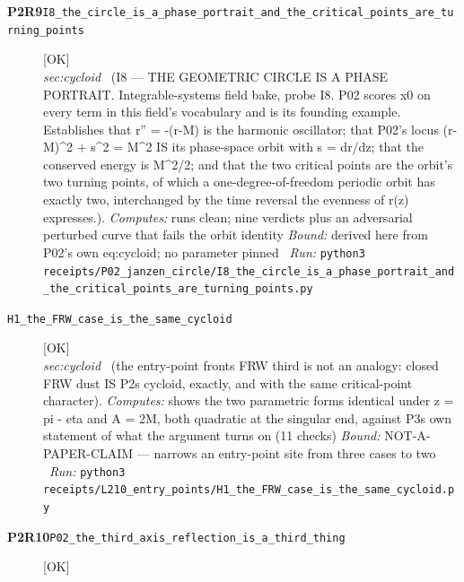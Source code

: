 \begin{description}
\item[\textbf{P2R9}\quad\texttt{I8\_the\_circle\_is\_a\_phase\_portrait\_and\_the\_critical\_points\_are\_turning\_points}]\hfill\textsf{[OK]}\\
\textit{sec:cycloid} \ (I8 --- THE GEOMETRIC CIRCLE IS A PHASE PORTRAIT. Integrable-systems field bake, probe I8. P02 scores x0 on every term in this field's vocabulary and is its founding example. Establishes that r'' = -(r-M) is the harmonic oscillator; that P02's locus (r-M)\textasciicircum{}2 + s\textasciicircum{}2 = M\textasciicircum{}2 IS its phase-space orbit with s = dr/dz; that the conserved energy is M\textasciicircum{}2/2; and that the two critical points are the orbit's two turning points, of which a one-degree-of-freedom periodic orbit has exactly two, interchanged by the time reversal the evenness of r(z) expresses.). 
\emph{Computes:} runs clean; nine verdicts plus an adversarial perturbed curve that fails the orbit identity
 \emph{Bound:} derived here from P02's own eq:cycloid; no parameter pinned
\ \emph{Run:} \texttt{python3 receipts/P02\_janzen\_circle/I8\_the\_circle\_is\_a\_phase\_portrait\_and\_the\_critical\_points\_are\_turning\_points.py}
\item[\label{rcpt:H1_the_FRW_case_is_the_same_cycloid}\textbf{}\quad\texttt{H1\_the\_FRW\_case\_is\_the\_same\_cycloid}]\hfill\textsf{[OK]}\\
\textit{sec:cycloid} \ (the entry-point fronts FRW third is not an analogy: closed FRW dust IS P2s cycloid, exactly, and with the same critical-point character). 
\emph{Computes:} shows the two parametric forms identical under z = pi - eta and A = 2M, both quadratic at the singular end, against P3s own statement of what the argument turns on (11 checks)
 \emph{Bound:} NOT-A-PAPER-CLAIM --- narrows an entry-point site from three cases to two
\ \emph{Run:} \texttt{python3 receipts/L210\_entry\_points/H1\_the\_FRW\_case\_is\_the\_same\_cycloid.py}
\item[\textbf{P2R10}\quad\texttt{P02\_the\_third\_axis\_reflection\_is\_a\_third\_thing}]\hfill\textsf{[OK]}\\

\end{description}
